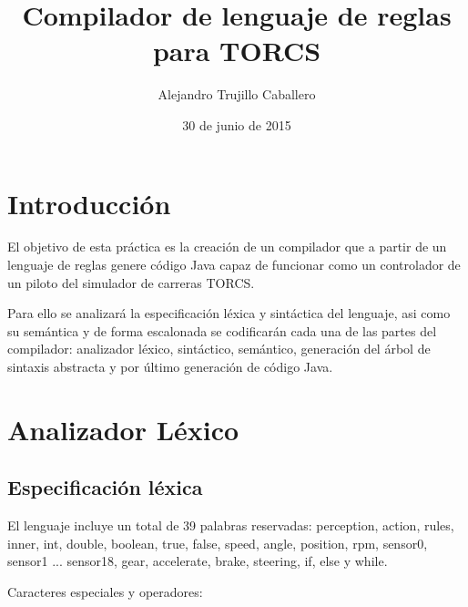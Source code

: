 \documentclass[11pt]{article}
\title{\textbf{\huge{Compilador de lenguaje de reglas para TORCS}}}
\author{Alejandro Trujillo Caballero}
\date{30 de junio de 2015}
\begin{document}
\maketitle
\thispagestyle{empty}
\newpage

\tableofcontents
\newpage

\section{Introducción}

El objetivo de esta práctica es la creación de un compilador que a partir de un lenguaje de reglas genere código Java
capaz de funcionar como un controlador de un piloto del simulador de carreras TORCS.


Para ello se analizará la especificación léxica y sintáctica del lenguaje, asi como su semántica y de forma escalonada se
codificarán cada una de las partes del compilador: analizador léxico, sintáctico, semántico, generación del árbol de sintaxis abstracta
y por último generación de código Java.

\section{Analizador Léxico}
\subsection{Especificación léxica}
El lenguaje incluye un total de 39 palabras reservadas:
perception, action, rules, inner, int, double, boolean, true, false, speed, angle, position, rpm, sensor0, sensor1 ... sensor18, gear, accelerate, brake, steering, if, else y while.

Caracteres especiales y operadores:
\end{document}
